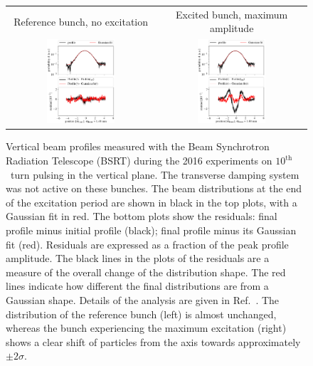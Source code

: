 \documentclass[%
 reprint,
 amsmath,amssymb,
 aps,
prstab,
longbibliography
]{revtex4-1}
\begin{document}
\begin{figure}
  \begin{tabular}{cc}
    Reference bunch, no excitation & Excited bunch, maximum amplitude \\
    \includegraphics[width=0.48\textwidth]{profile_v_10thv_slot_50.png} &
    \includegraphics[width=0.48\textwidth]{profile_v_10thv_slot_1300.png}\\
    \end{tabular}
    \caption{Vertical beam profiles measured with the Beam Synchrotron
      Radiation Telescope (BSRT) during the 2016 experiments on
      $10^{\mathrm{th}}$~turn pulsing in the vertical plane. The
      transverse damping system was not active on these bunches. The
      beam distributions at the end of the excitation period are shown
      in black in the top plots, with a Gaussian fit in red. The
      bottom plots show the residuals: final profile minus initial
      profile (black); final profile minus its Gaussian fit
      (red). Residuals are expressed as a fraction of the peak profile
      amplitude. The black lines in the plots of the residuals are a
      measure of the overall change of the distribution shape. The red
      lines indicate how different the final distributions are from a
      Gaussian shape. Details of the analysis are given in
      Ref.~\cite{bsrtprofinj}. The distribution of the reference bunch
      (left) is almost unchanged, whereas the bunch experiencing the
      maximum excitation (right) shows a clear shift of particles from
      the axis towards approximately $\pm 2\sigma$.}
    \label{fig:10thexpprof}
\end{figure}
\end{document}
